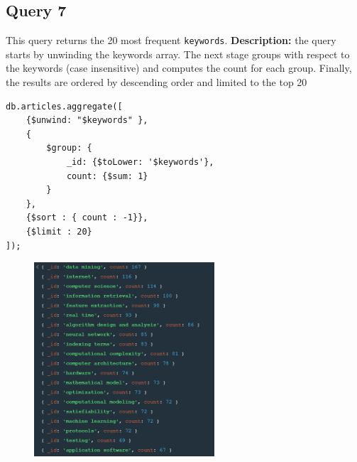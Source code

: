 \documentclass{Configuration_Files/PoliMi3i_thesis}
\begin{document}
\subsection{Query 7}
This query returns the 20 most frequent \verb |keywords|.\newline
\textbf{Description:} the query starts by unwinding the keywords array. The next stage groups with respect to the
keywords (case insensitive) and computes the count for each group. Finally, the results are ordered by descending order
and limited to the top 20
\begin{lstlisting}
db.articles.aggregate([
	{$unwind: "$keywords" },
	{
		$group: {
			_id: {$toLower: '$keywords'},
			count: {$sum: 1}
		}
	},
	{$sort : { count : -1}},
	{$limit : 20}
]);
\end{lstlisting}
\begin{figure}[H]
\centering
\includegraphics[width=0.6\textwidth]{query/mongo_q7.PNG}
\label{fig:query7}
\end{figure}
\end{document}
